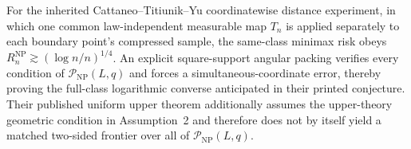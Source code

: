 For the inherited Cattaneo--Titiunik--Yu coordinatewise distance experiment, in which one common law-independent measurable map \(T_n\) is applied separately to each boundary point's compressed sample, the same-class minimax risk obeys \(R_n^{\mathrm{NP}}\gtrsim(\log n/n)^{1/4}\).  An explicit square-support angular packing verifies every condition of \(\mathcal P_{\mathrm{NP}}(L,q)\) and forces a simultaneous-coordinate error, thereby proving the full-class logarithmic converse anticipated in their printed conjecture.  Their published uniform upper theorem additionally assumes the upper-theory geometric condition in Assumption~2 and therefore does not by itself yield a matched two-sided frontier over all of \(\mathcal P_{\mathrm{NP}}(L,q)\).